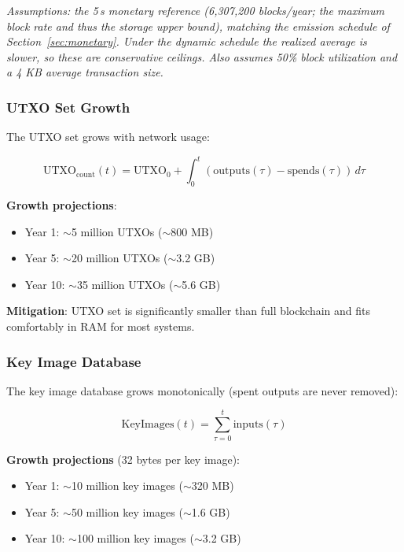 \textit{Assumptions: the 5\,s monetary reference (6{,}307{,}200 blocks/year;
the maximum block rate and thus the storage upper bound), matching the
emission schedule of Section~\ref{sec:monetary}. Under the dynamic schedule
the realized average is slower, so these are conservative ceilings. Also
assumes 50\% block utilization and a 4 KB average transaction size.}

\subsubsection{UTXO Set Growth}

The UTXO set grows with network usage:

\begin{equation}
\text{UTXO}_{\text{count}}(t) = \text{UTXO}_0 + \int_0^t (\text{outputs}(\tau) - \text{spends}(\tau)) \, d\tau
\end{equation}

\textbf{Growth projections}:
\begin{itemize}
  \item Year 1: $\sim$5 million UTXOs ($\sim$800 MB)
  \item Year 5: $\sim$20 million UTXOs ($\sim$3.2 GB)
  \item Year 10: $\sim$35 million UTXOs ($\sim$5.6 GB)
\end{itemize}

\textbf{Mitigation}: UTXO set is significantly smaller than full blockchain
and fits comfortably in RAM for most systems.

\subsubsection{Key Image Database}

The key image database grows monotonically (spent outputs are never removed):

\begin{equation}
\text{KeyImages}(t) = \sum_{\tau=0}^{t} \text{inputs}(\tau)
\end{equation}

\textbf{Growth projections} (32 bytes per key image):
\begin{itemize}
  \item Year 1: $\sim$10 million key images ($\sim$320 MB)
  \item Year 5: $\sim$50 million key images ($\sim$1.6 GB)
  \item Year 10: $\sim$100 million key images ($\sim$3.2 GB)
\end{itemize}


